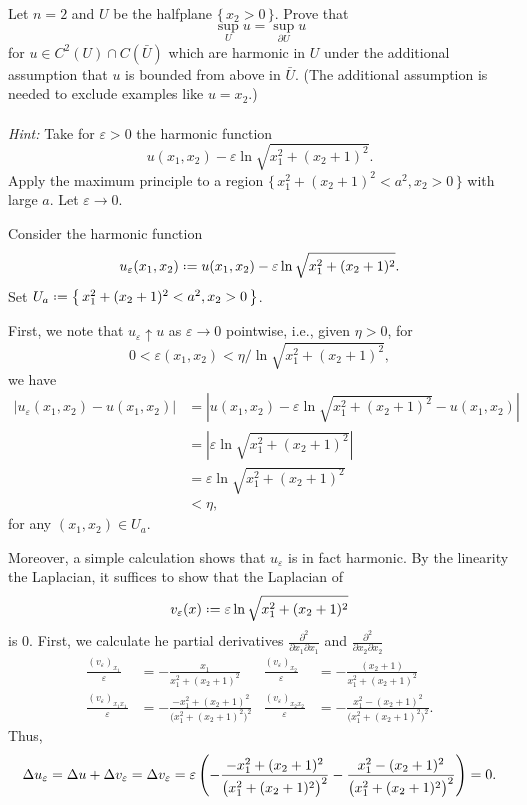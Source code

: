\begin{problem}
  Let \(n=2\) and \(U\) be the halfplane \(\{\,x_2>0\,\}\). Prove that
  \[
    \sup_U u=\sup_{\partial U}u
  \]
  for \(u\in C^2(U)\cap C(\bar U)\) which are harmonic in \(U\) under the
  additional assumption that \(u\) is bounded from above in \(\bar
  U\). (The additional assumption is needed to exclude examples like
  \(u=x_2\).)
  \\\\
  \emph{Hint:} Take for \(\varepsilon>0\) the harmonic function
  \[
    u(x_1,x_2)-\varepsilon\ln\sqrt{x_1^2+(x_2+1)^2}.
  \]
  Apply the maximum principle to a region
  \(\bigl\{\,x_1^2+(x_2+1)^2<a^2,x_2>0\,\bigr\}\) with large \(a\). Let
  \(\varepsilon\to 0\).
\end{problem}
\begin{solution*}
  Consider the harmonic function
  \[
    u_\varepsilon(x_1,x_2)\defeq
    u(x_1,x_2)-\varepsilon\ln\sqrt{x_1^2+(x_2+1)^2}.
  \]
  Set \(U_a\defeq \bigl\{\,x_1^2+(x_2+1)^2<a^2,x_2>0\,\bigr\}\).

  First, we note that \(u_\varepsilon\uparrow u\) as \(\varepsilon\to 0\)
  pointwise, i.e., given \(\eta>0\), for
  \[
    0<\varepsilon(x_1,x_2)<\eta/{\ln\sqrt{x_1^2+(x_2+1)^2}},
  \]
  we have
  \begin{align*}
    |u_\varepsilon(x_1,x_2)-u(x_1,x_2)|
    &=\left|
      u(x_1,x_2)-\varepsilon\ln\sqrt{x_1^2+(x_2+1)^2}
      -u(x_1,x_2)
      \right|\\
    &=\left|
      \varepsilon\ln\sqrt{x_1^2+(x_2+1)^2}
      \right|\\
    &=\varepsilon\ln\sqrt{x_1^2+(x_2+1)^2}\\
    &<\eta,
  \end{align*}
  for any \((x_1,x_2)\in U_a\).

  Moreover, a simple calculation shows that \(u_\varepsilon\) is in fact
  harmonic. By the linearity the Laplacian, it suffices to show that the
  Laplacian of
  \[
    v_\varepsilon(x)\defeq\varepsilon\ln\sqrt{x_1^2+(x_2+1)^2}%
  \]
  is \(0\). First, we calculate he partial derivatives
  \(\frac{\partial^2}{\partial x_1\partial x_1}\) and
  \(\frac{\partial^2}{\partial x_2\partial x_2}\)
  \begin{align*}
   \frac{(v_\varepsilon)_{x_1}}{\varepsilon}
    &=-\frac{x_1}{x_1^2+(x_2+1)^2}
    &\frac{(v_\varepsilon)_{x_2}}{\varepsilon}
    &=-\frac{(x_2+1)}{x_1^2+(x_2+1)^2}\\
    \frac{(v_{\varepsilon})_{x_1x_1}}{\varepsilon}
    &=-\frac{-x_1^2+(x_2+1)^2}{\bigl(x_1^2+(x_2+1)^2\bigr)^2}
    &\frac{(v_{\varepsilon})_{x_2x_2}}{\varepsilon}
    &=-\frac{x_1^2-(x_2+1)^2}{\bigl(x_1^2+(x_2+1)^2\bigr)^2}.
  \end{align*}
  Thus,
  \[
    \Lap u_\varepsilon=\Lap u+\Lap v_\varepsilon=
    \Lap v_\varepsilon=\varepsilon
    \left(
      -\frac{-x_1^2+(x_2+1)^2}{\bigl(x_1^2+(x_2+1)^2\bigr)^2}
      -\frac{x_1^2-(x_2+1)^2}{\bigl(x_1^2+(x_2+1)^2\bigr)^2}
    \right)=0.
  \]


\end{solution*}
